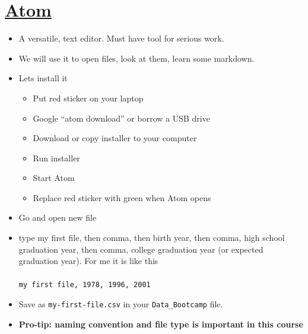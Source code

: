 \section*{\href{https://atom.io/}{Atom}}
\begin{itemize}
\item A versatile, text editor. Must have tool for serious work.
\item We will use it to open files, look at them, learn some markdown.
\item Lets install it
\begin{itemize}
\item Put red sticker on your laptop
\item Google ``atom download'' or borrow a USB drive
\item Download or copy installer to your computer
\item Run installer
\item Start Atom
\item Replace red sticker with green when Atom opens
\end{itemize}
\item Go and open new file
\item type my first file, then comma, then birth year, then comma, high school graduation year, then comma, college graduation year (or expected graduation year). For me it is like this\\
    \\
{\tt my first file, 1978, 1996, 2001} 
\item Save as {\tt my-first-file.csv} in your \verb|Data_Bootcamp| file.
\item \textbf{Pro-tip: naming convention and file type is important in this course}
\end{itemize}


